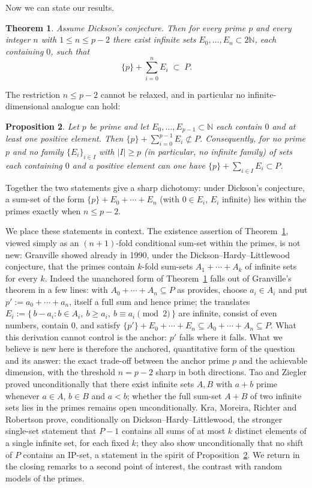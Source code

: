 \documentclass[11pt]{amsart}
\newtheorem{theorem}{Theorem}
\newtheorem{proposition}[theorem]{Proposition}
\theoremstyle{remark}
\newcommand{\NN}{\mathbb{N}}
\newcommand{\PP}{P}
\begin{document}
Now we can state our results.

\begin{theorem}\label{thm:main}
Assume Dickson's conjecture.  Then for every prime $p$ and every
integer $n$ with $1\le n\le p-2$ there exist infinite sets
$E_0,\dots,E_n\subset 2\NN$, each containing $0$, such that
\[
\{p\}+\sum_{i=0}^{n}E_i \;\subset\; \PP .
\]
\end{theorem}

The restriction $n\le p-2$ cannot be relaxed, and in particular no
infinite-dimensional analogue can hold:

\begin{proposition}\label{prop:sharp}
Let $p$ be prime and let $E_0,\dots,E_{p-1}\subset\NN$ each contain
$0$ and at least one positive element.  Then
$\{p\}+\sum_{i=0}^{p-1}E_i \not\subset \PP$.  Consequently, for no
prime $p$ and no family $\{E_i\}_{i\in I}$ with $|I|\ge p$ (in
particular, no infinite family) of sets each containing $0$ and a
positive element can one have $\{p\}+\sum_{i\in I}E_i\subset\PP$.
\end{proposition}

Together the two statements give a sharp dichotomy: under Dickson's
conjecture, a sum-set of the form $\{p\}+E_0+\cdots+E_n$ (with
$0\in E_i$, $E_i$ infinite) lies within the primes exactly when
$n\le p-2$.

We place these statements in context.  The existence assertion of
Theorem~\ref{thm:main}, viewed simply as an $(n+1)$-fold conditional
sum-set within the primes, is not new: Granville \cite{Granville}
showed already in 1990, under the Dickson--Hardy--Littlewood
conjecture, that the primes contain $k$-fold sum-sets
$A_1+\cdots+A_k$ of infinite sets for every $k$.  Indeed the
unanchored form of Theorem~\ref{thm:main} falls out of Granville's
theorem in a few lines: with $A_0+\cdots+A_n\subseteq\PP$ as
\cite{Granville} provides, choose $a_i\in A_i$ and put
$p' := a_0+\cdots+a_n$, itself a full sum and hence prime; the
translates $E_i := \{\,b-a_i : b\in A_i,\ b\ge a_i,\ b\equiv a_i
\pmod 2\,\}$ are infinite, consist of even numbers, contain $0$, and
satisfy $\{p'\}+E_0+\cdots+E_n \subseteq A_0+\cdots+A_n
\subseteq\PP$.  What this derivation cannot control is the anchor:
$p'$ falls where it falls.  What we
believe is new here is therefore the anchored, quantitative form of the
question and its answer: the exact trade-off between the anchor prime
$p$ and the achievable dimension, with the threshold $n=p-2$ sharp in
both directions.  Tao and Ziegler \cite{TaoZiegler} proved
unconditionally that there exist infinite sets $A,B$ with $a+b$ prime
whenever $a\in A$, $b\in B$ and $a<b$; whether the full sum-set $A+B$
of two infinite sets lies in the primes remains open unconditionally.
Kra, Moreira, Richter and Robertson \cite{KMRRsurvey} prove,
conditionally on Dickson--Hardy--Littlewood, the stronger single-set
statement that $\PP-1$ contains all sums of at most $k$ distinct
elements of a single infinite set, for each fixed $k$; they also show
unconditionally that no shift of $\PP$ contains an IP-set, a statement
in the spirit of Proposition~\ref{prop:sharp}.  We
return in the closing remarks to a second point of interest, the
contrast with random models of the primes.
\end{document}
